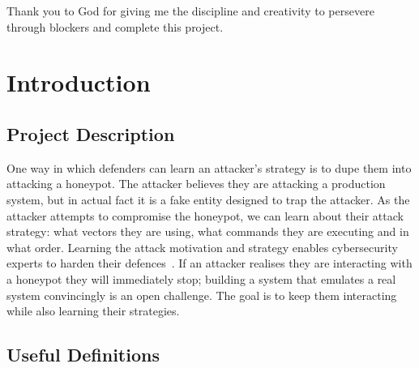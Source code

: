 \documentclass[12pt, a4paper]{report}   %
\providecommand{\mainmatter}{\pagenumbering{arabic}}
\begin{document}
Thank you to God for giving me the discipline and creativity to persevere
through blockers and complete this project.

\tableofcontents
\listoffigures
\listoftables

\mainmatter

\chapter{Introduction}

\section{Project Description}

One way in which defenders can learn an attacker's strategy is to dupe them into
attacking a honeypot. The attacker believes they are attacking a production system,
but in actual fact it is a fake entity designed to trap the attacker. As the attacker
attempts to compromise the honeypot, we can learn about their attack strategy: what
vectors they are using, what commands they are executing and in what order. Learning
the attack motivation and strategy enables cybersecurity experts to harden their
defences~\cite{awesome-honeypots}. If an attacker realises they are interacting with 
a honeypot they will immediately stop; building a system that emulates a real system 
convincingly is an open challenge. The goal is to keep them interacting while also 
learning their strategies.

\section{Useful Definitions}
\label{sec:definitions}
\end{document}
